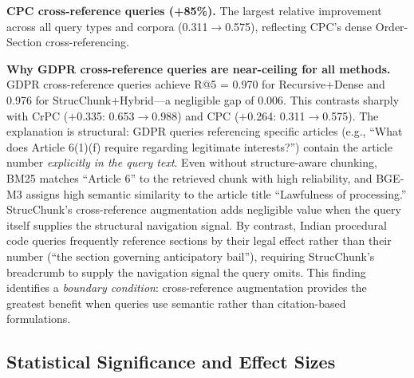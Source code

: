 \documentclass[sn-mathphys,Numbered]{sn-jnl}%
\begin{document}
\textbf{CPC cross-reference queries (+85\%).}  The largest relative
improvement across all query types and corpora (0.311$\to$0.575), reflecting
CPC's dense Order-Section cross-referencing.

\textbf{Why GDPR cross-reference queries are near-ceiling for all methods.}
GDPR cross-reference queries achieve R@5 = 0.970 for Recursive+Dense and
0.976 for StrucChunk+Hybrid---a negligible gap of 0.006.  This contrasts
sharply with CrPC ($+$0.335: 0.653$\to$0.988) and CPC ($+$0.264:
0.311$\to$0.575).  The explanation is structural: GDPR queries referencing
specific articles (e.g., ``What does Article 6(1)(f) require regarding
legitimate interests?'') contain the article number \emph{explicitly in
the query text}.  Even without structure-aware chunking, BM25 matches
``Article 6'' to the retrieved chunk with high reliability, and BGE-M3
assigns high semantic similarity to the article title ``Lawfulness of
processing.''  StrucChunk's cross-reference augmentation adds negligible
value when the query itself supplies the structural navigation signal.  By
contrast, Indian procedural code queries frequently reference sections by
their legal effect rather than their number (``the section governing
anticipatory bail''), requiring StrucChunk's breadcrumb to supply the
navigation signal the query omits.  This finding identifies a
\emph{boundary condition}: cross-reference augmentation provides the
greatest benefit when queries use semantic rather than citation-based
formulations.

\subsection{Statistical Significance and Effect Sizes}
\end{document}

